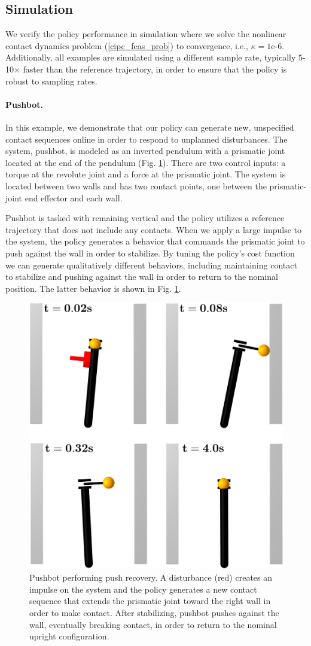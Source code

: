 \subsection{Simulation}
We verify the policy performance in simulation  where we solve the nonlinear contact dynamics problem (\ref{cipc_feas_prob}) to convergence, i.e., $\kappa = 1\mbox{e-}6$. Additionally, all examples are simulated using a different sample rate, typically 5-10$\times$ faster than the reference trajectory, in order to ensure that the policy is robust to sampling rates. 

\paragraph{Pushbot.}
In this example, we demonstrate that our policy can generate new, unspecified contact sequences online in order to respond to unplanned disturbances. The system, pushbot, is modeled as an inverted pendulum with a prismatic joint located at the end of the pendulum (Fig. \ref{cipc_pushbot_push_recovery}). There are two control inputs: a torque at the revolute joint and a force at the prismatic joint. The system is located between two walls and has two contact points, one between the prismatic-joint end effector and each wall.

Pushbot is tasked with remaining vertical and the policy utilizes a reference trajectory that does not include any contacts. When we apply a large impulse to the system, the policy generates a behavior that commands the prismatic joint to push against the wall in order to stabilize. By tuning the policy's cost function we can generate qualitatively different behaviors, including maintaining contact to stabilize and pushing against the wall in order to return to the nominal position. The latter behavior is shown in Fig. \ref{cipc_pushbot_push_recovery}.

\begin{figure}[H]
	\centering
	\includegraphics[width=.45\textwidth]{ci_pc/pushbot_figure_timings.png}
	\caption[Pushbot performing push recovery]{Pushbot performing push recovery. A disturbance (red) creates an impulse on the system and the policy generates a new contact sequence that extends the prismatic joint toward the right wall in order to make contact. After stabilizing, pushbot pushes against the wall, eventually breaking contact, in order to return to the nominal upright configuration.}
	\label{cipc_pushbot_push_recovery}
\end{figure}


